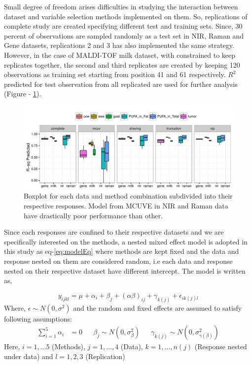 \documentclass[10pt, a4paper]{article}\usepackage[]{graphicx}\usepackage[]{color}
\makeatletter
\def\maxwidth{ %
  \ifdim\Gin@nat@width>\linewidth
    \linewidth
  \else
    \Gin@nat@width
  \fi
}
\newenvironment{knitrout}{}{} %
\makeatother
\begin{document}
Small degree of freedom arises difficulties in studying the interaction between dataset and variable selection methods implemented on them. So, replications of complete study are created specifying different test and training sets. Since, 30 percent of observations are sampled randomly as a test set in NIR, Raman and Gene datasets, replications 2 and 3 has also implemented the same strategy. However, in the case of MALDI-TOF milk dataset, with constrained to keep replicates together, the second and third replicates are created by keeping 120 observations as training set starting from position 41 and 61 respectively. $R^2$ predicted for test observation from all replicated are used for further analysis (Figure - \ref{fig:testPlot}).


\begin{knitrout}\small
{}\color{fgcolor}\begin{figure}[H]
\includegraphics[width=\maxwidth]{figure/testPlot-1} \caption[Boxplot for each data and method combination subdivided into their respective responses]{Boxplot for each data and method combination subdivided into their respective responses. Model from MCUVE in NIR and Raman data have drastically poor performance than other.}\label{fig:testPlot}
\end{figure}


\end{knitrout}

Since each responses are confined to their respective datasets and we are specifically interested on the methods, a nested mixed effect model is adopted in this study as eq-\ref{eq:modelEq} where methods are kept fixed and the data and response nested on them are considered random, i.e each data and response nested on their respective dataset have different intercept. The model is written as,

\begin{equation}
\label{eq:modelEq}
  y_{ijkl} = \mu + \alpha_{i} + \beta_{j} + (\alpha\beta)_{ij} + \gamma_{k(j)} + \epsilon_{ik(j)l}
\end{equation}
Where, $\epsilon \sim N(0, \sigma^2)$ and the random and fixed effects are assumed to satisfy following assumptions:
\begin{align*}
\sum_{i = 1}^5 {\alpha_i} &= 0 && \beta_{j} \sim N(0, \sigma_\beta^2) &&
\gamma_{k(j)} \sim N(0, \sigma_{\gamma(\beta)}^2)
\end{align*}
Here, $i = 1, \ldots 5$ (Methods), $j = 1, \ldots, 4$ (Data), $k = 1, \ldots, n(j)$ (Response nested under data) and $l = 1, 2, 3$ (Replication)
\end{document}
